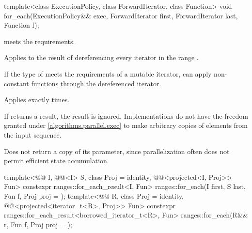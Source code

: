 %
\begin{itemdecl}
template<class ExecutionPolicy, class ForwardIterator, class Function>
  void for_each(ExecutionPolicy&& exec,
                ForwardIterator first, ForwardIterator last,
                Function f);
\end{itemdecl}

\begin{itemdescr}
\pnum
\expects
{} meets the  requirements.

\pnum
\effects
Applies  to the result of dereferencing
every iterator in the range .
\begin{note}
If the type of  meets the requirements of a mutable iterator,
 can apply non-constant functions through the dereferenced iterator.
\end{note}

\pnum
\complexity
Applies  exactly  times.

\pnum
\remarks
If  returns a result, the result is ignored.
Implementations do not have
the freedom granted under \ref{algorithms.parallel.exec}
to make arbitrary copies of elements from the input sequence.

\pnum
\begin{note}
Does not return a copy of its  parameter,
since parallelization often does not permit efficient state accumulation.
\end{note}
\end{itemdescr}

%
\begin{itemdecl}
template<@@ I, @@<I> S, class Proj = identity,
         @@<projected<I, Proj>> Fun>
  constexpr ranges::for_each_result<I, Fun>
    ranges::for_each(I first, S last, Fun f, Proj proj = {});
template<@@ R, class Proj = identity,
         @@<projected<iterator_t<R>, Proj>> Fun>
  constexpr ranges::for_each_result<borrowed_iterator_t<R>, Fun>
    ranges::for_each(R&& r, Fun f, Proj proj = {});
\end{itemdecl}

